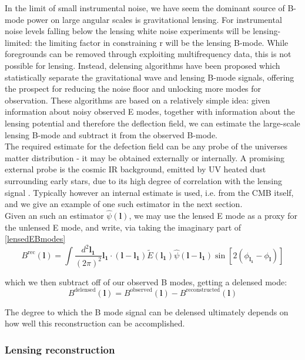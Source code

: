 \documentclass[a4paper,10pt]{article}
\renewcommand{\v}[1]{\mathbf{#1}}
\newcommand{\finttwo}[1]{\int \frac{d^2 \v{#1}}{(2\pi)^2}}
\begin{document}
In the limit of small instrumental noise, we have seem the dominant source of B-mode power on large angular scales is gravitational lensing. For instrumental noise levels falling below the lensing white noise experiments will be lensing-limited: the limiting factor in constraining r will be the lensing B-mode. While foregrounds can be removed through exploiting multifrequency data, this is not possible for lensing. Instead, delensing algorithms have been proposed  which statistically separate the gravitational wave and lensing B-mode signals, offering the prospect for reducing the noise floor and unlocking more modes for observation. These algorithms are based on a relatively simple idea: given information about noisy observed E modes, together with information about the lensing potential and therefore the deflection field, we can estimate the large-scale lensing B-mode and subtract it from the observed B-mode.\\

The required estimate for the defection field can be any probe of the universes matter distribution -  it may be obtained externally or internally. A promising external probe is the cosmic IR background, emitted by UV heated dust surrounding early stars, due to its high degree of correlation with the lensing signal \cite{sherwin}. Typically however an internal estimate is used, i.e. from the CMB itself, and we give an example of one such estimator in the next section. \\

Given an such an estimator $\hat{\psi}(\v{l})$, we may use the lensed E mode as a proxy for the unlensed E mode, and write, via taking the imaginary part of \ref{lensedEBmodes}
\begin{equation}
B^{\text{rec}}(\v{l}) = \finttwo{l_1} \v{l_1}\cdot(\v{l}-\v{l_1}) \tilde{E}(\v{l_1})\hat{\psi}(\v{l}-\v{l_1})\sin[2(\phi_\v{l_1}-\phi_\v{l})]
\label{sin}
\end{equation} 

which we then subtract off of our observed B modes, getting a delensed mode:
\begin{equation}
B^{\text{delensed}}(\v{l}) = B^{\text{observed}}(\v{l}) - B^{\text{reconstructed}}(\v{l})
\end{equation}

The degree to which the B mode signal can be delensed ultimately depends on how well this reconstruction can be accomplished. 

\subsubsection{Lensing reconstruction}
\end{document}
